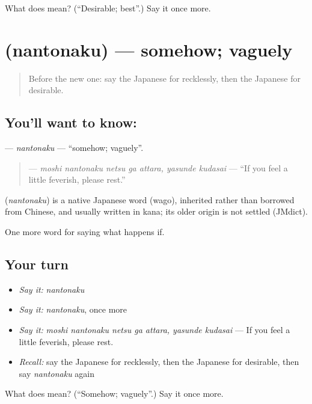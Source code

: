 \begin{tcolorbox}[breakable,colback=teal!4,colframe=teal!35!black,title={Before you move on}]
What does  mean? (\textquotedblleft{}Desirable; best\textquotedblright{}.) Say it once more.
\end{tcolorbox}
\section[\texorpdfstring{\ja{なんとなく} (nantonaku)}{なんとなく (nantonaku)}]{ (nantonaku) — somehow; vaguely}

\label{lesson:JA-C531-nantonaku}



\begin{quote}
Before the new one: say the Japanese for recklessly, then the Japanese for desirable.
\end{quote}

\subsection*{You'll want to know: }
\textbf{} — \emph{nantonaku} — \textquotedblleft{}somehow; vaguely\textquotedblright{}.

\begin{quote}
\textbf{    } — \emph{moshi nantonaku netsu ga attara, yasunde kudasai} — \textquotedblleft{}If you feel a little feverish, please rest.\textquotedblright{}
\end{quote}

\begin{cousinweb}
\textbf{} (\emph{nantonaku}) is a native Japanese word (wago), inherited rather than borrowed from Chinese, and usually written in kana; its older origin is not settled (JMdict).
\end{cousinweb}

\begin{grammarlens}[title={What you've built}]
One more word for saying what happens if.
\end{grammarlens}

\subsection*{Your turn}
\begin{itemize}
\raggedright
  \item \emph{Say it:} \emph{nantonaku}
  \item \emph{Say it:} \emph{nantonaku}, once more
  \item \emph{Say it:} \emph{moshi nantonaku netsu ga attara, yasunde kudasai} — If you feel a little feverish, please rest.
  \item \emph{Recall:} say the Japanese for recklessly, then the Japanese for desirable, then say \emph{nantonaku} again
\end{itemize}

\begin{tcolorbox}[breakable,colback=teal!4,colframe=teal!35!black,title={Before you move on}]
What does  mean? (\textquotedblleft{}Somehow; vaguely\textquotedblright{}.) Say it once more.
\end{tcolorbox}
